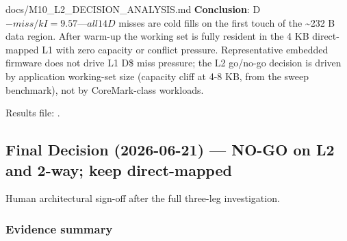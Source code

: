 \begin{relocated}{docs/M10_L2_DECISION_ANALYSIS.md}
\textbf{Conclusion}: D\(-miss/kI = 9.57 — all 14 D\) misses are cold
fills on the first touch of the \textasciitilde232 B data region. After
warm-up the working set is fully resident in the 4 KB direct-mapped L1
with zero capacity or conflict pressure. Representative embedded
firmware does not drive L1 D\$ miss pressure; the L2 go/no-go decision
is driven by application working-set size (capacity cliff at 4-8 KB,
from the sweep benchmark), not by CoreMark-class workloads.

Results file: .

\subsection{Final Decision (2026-06-21) --- NO-GO on L2 and 2-way;
keep direct-mapped}\label{tm:dec:m10-l2:10-final-decision-2026-06-21-no-go-on-l2-and-2-way-keep-direct-mapped}

Human architectural sign-off after the full three-leg investigation.

\subsubsection{Evidence summary}\label{tm:dec:m10-l2:evidence-summary}

{\small\setlength{\tabcolsep}{4pt}

}
\end{relocated}
